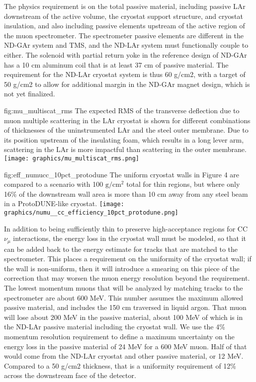 The physics requirement is on the total passive material, including passive LAr downstream of the active volume, the cryostat support structure, and cryostat insulation, and also including passive elements upstream of the active region of the muon spectrometer. The spectrometer passive elements are different in the ND-GAr system and TMS, and the ND-LAr system must functionally couple to either. The solenoid with partial return yoke in the reference design of ND-GAr has a 10 cm aluminum coil that is at least 37 cm of passive material. The requirement for the ND-LAr cryostat system is thus 60 g/cm2, with a target of 50 g/cm2 to allow for additional margin in the ND-GAr magnet design, which is not yet finalized.

\begin{dunefigure}{fig:mu_multiscat_rms}
{The expected RMS of the transverse deflection due to muon multiple scattering in the LAr cryostat is shown for different combinations of thicknesses of the uninstrumented LAr and the steel outer membrane. Due to its position upstream of the insulating foam, which results in a long lever arm, scattering in the LAr is more impactful than scattering in the outer membrane.}
\texttt{[image: graphics/mu\_multiscat\_rms.png]}
\end{dunefigure}

\begin{dunefigure}{fig:eff_numucc_10pct_protodune}
{The uniform cryostat walls in Figure 4 are compared to a scenario with 100 $\mbox{g}/\mbox{cm}^2$ total for thin regions, but where only 16\% of the downstream wall area is more than 10 cm away from any steel beam in a ProtoDUNE-like cryostat.}
\texttt{[image: graphics/numu\_\_cc\_efficiency\_10pct\_protodune.png]}
\end{dunefigure}


In addition to being sufficiently thin to preserve high-acceptance regions for CC $\nu_\mu$ interactions, the energy loss in the cryostat wall must be modeled, so that it can be added back to the energy estimate for tracks that are matched to the spectrometer. This places a requirement on the uniformity of the cryostat wall; if the wall is non-uniform, then it will introduce a smearing on this piece of the correction that may worsen the muon energy resolution beyond the requirement. The lowest momentum muons that will be analyzed by matching tracks to the spectrometer are about 600 MeV. This number assumes the maximum allowed passive material, and includes the 150 cm traversed in liquid argon. That muon will lose about 200 MeV in the passive material, about 100 MeV of which is in the ND-LAr passive material including the cryostat wall. We use the 4\% momentum resolution requirement to define a maximum uncertainty on the energy loss in the passive material of 24 MeV for a 600 MeV muon. Half of that would come from the ND-LAr cryostat and other passive material, or 12 MeV. Compared to a 50 g/cm2 thickness, that is a uniformity requirement of 12\% across the downstream face of the detector.

